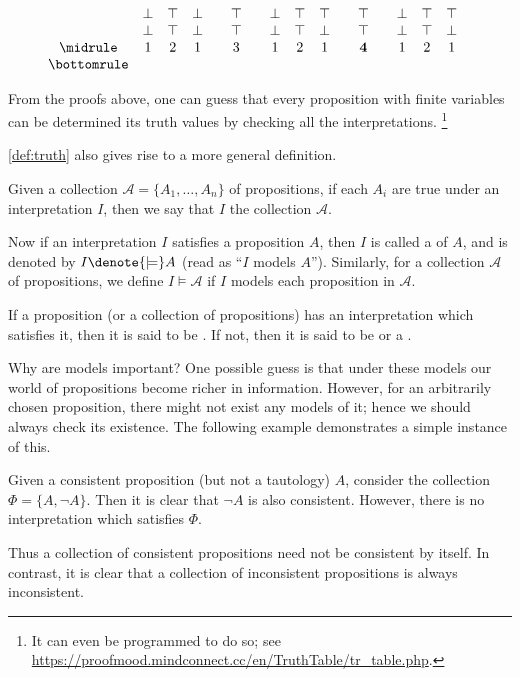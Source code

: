 \begin{myproof}
\begin{nlist}[resume]
\[\begin{array}{c c c c c c c c c c c c c c c c c}
                 & \bot & \top & \bot & 
                 & \top &  & \bot & \top & \top & 
                 & \top &  & \bot & \top & \top &  \\
                 & \bot & \top & \bot & 
                 & \top &  & \bot & \top & \bot & 
                 & \top &  & \bot & \top & \bot &  \\
                \midrule
                 & 1 & 2 & 1 & 
                & 3 &  & 1 & 2 & 1 &
                & \mathbf 4 &  & 1 & 2 & 1  & \\
                \bottomrule
            \end{array}
        \]
    \end{nlist}
\end{myproof}

From the proofs above,
one can guess that
every proposition with finite variables
can be determined its truth values by checking all the interpretations.%
\footnote{It can even be programmed to do so;
see \url{https://proofmood.mindconnect.cc/en/TruthTable/tr_table.php}.}

\cref{def:truth} also gives rise to a more general definition.

\begin{definition}[Models]
    \label{def:model}
    Given a collection \(\mathcal A=\{A_1,\dots,A_n\}\) of propositions,
    if each \(A_i\) are true under an interpretation \(I\),
    then we say that
    \(I\)  the collection \(\mathcal A\).

    Now if an interpretation \(I\) satisfies a proposition \(A\),
    then \(I\) is called a  of \(A\),
    and is denoted by \(I\denote{\models} A\)
    (read as ``\(I\) models \(A\)'').
    Similarly, for a collection \(\mathcal A\) of propositions,
    we define \(I\models\mathcal A\)
    if \(I\) models each proposition in \(\mathcal A\).

    If a proposition (or a collection of propositions)
    has an interpretation which satisfies it,
    then it is said to be .
    If not, then it is said to be 
    or a .
\end{definition}

Why are models important?
One possible guess is that
under these models
our world of propositions become richer in information.
However,
for an arbitrarily chosen proposition,
there might not exist any models of it;
hence we should always check its existence.
The following example demonstrates a simple instance of this.

\begin{example}
    \label{exm:satisfy}
    Given a consistent proposition (but not a tautology) \(A\),
    consider the collection \(\Phi=\{A,\neg A\}\).
    Then it is clear that \(\neg A\) is also consistent.
    However, there is no interpretation which satisfies \(\Phi\).
\end{example}

Thus a collection of consistent propositions
need not be consistent by itself.
In contrast, it is clear that
a collection of inconsistent propositions
is always inconsistent.